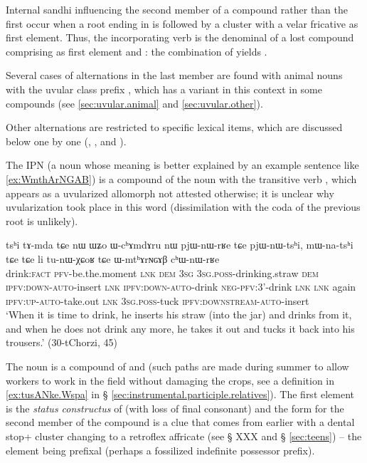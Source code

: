 Internal sandhi influencing the second member of a compound rather than the first occur when a root ending in  is followed by a cluster with a velar fricative as first element. Thus, the incorporating verb  is the denominal of a lost compound  comprising  as first element and : the combination of  yields .

Several cases of alternations in the last member are found with animal nouns with the uvular class prefix , which has a variant  in this context in some compounds (see \ref{sec:uvular.animal} and \ref{sec:uvular.other}). 

Other alternations are restricted to specific lexical items, which are discussed below one by one (, ,  and ).

The IPN  (a noun whose meaning is better explained by an example sentence like \ref{ex:WmthArNGAB}) is a compound of the noun  with the transitive verb , which appears as a uvularized allomorph  not attested otherwise; it is unclear why uvularization took place in this word (dissimilation with the coda  of the previous root is unlikely).

\begin{exe}
\ex \label{ex:WmthArNGAB}
\gll tsʰi tɤ-mda tɕe nɯ ɯʑo ɯ-cʰɤmdɤru nɯ pjɯ-nɯ-rʁe tɕe pjɯ-nɯ-tsʰi, mɯ-na-tsʰi tɕe tɕe li tu-nɯ-χɕoʁ tɕe ɯ-mtʰɤrɴɢɤβ cʰɯ-nɯ-rʁe \\
drink:\textsc{fact} \textsc{pfv}-be.the.moment \textsc{lnk} \textsc{dem} \textsc{3sg} \textsc{3sg.poss}-drinking.straw \textsc{dem} \textsc{ipfv}:\textsc{down}-\textsc{auto}-insert \textsc{lnk} \textsc{ipfv}:\textsc{down}-\textsc{auto}-drink \textsc{neg}-\textsc{pfv}:3'-drink \textsc{lnk} \textsc{lnk} again \textsc{ipfv}:\textsc{up}-\textsc{auto}-take.out \textsc{lnk} \textsc{3sg.poss}-tuck \textsc{ipfv}:\textsc{downstream}-\textsc{auto}-insert \\
\glt `When it is time to drink, he inserts his straw (into the jar) and drinks from it, and when he does not drink any more, he takes it out and tucks it back into his trousers.' (30-tChorzi, 45)
\end{exe}

The noun  is a compound of  and  (such paths are made during summer to allow workers to work in the field without damaging the crops, see a definition in \ref{ex:tusANke.Wspa} in § \ref{sec:instrumental.participle.relatives}). The first element  is the \textit{status constructus} of  (with loss of final consonant) and the form  for the second member of the compound is a clue that  comes from earlier  with a dental stop+ cluster changing to a retroflex affricate (see § XXX and § \ref{sec:teens}) -- the  element being prefixal (perhaps a fossilized indefinite possessor prefix).

